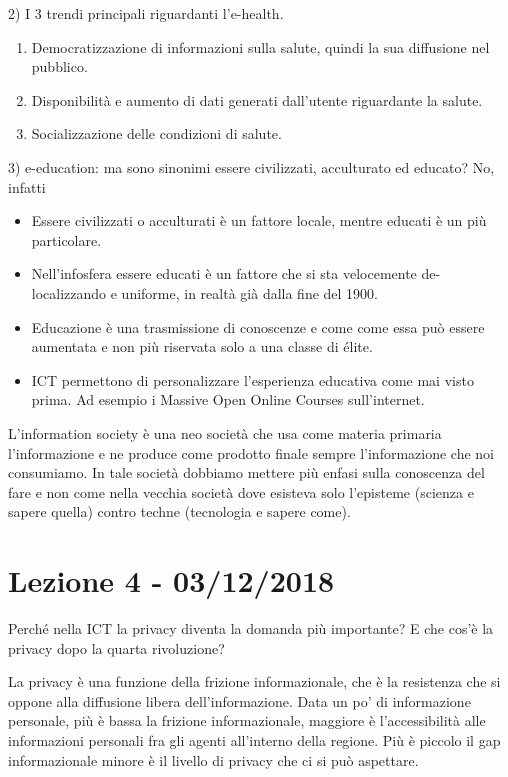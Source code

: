 \documentclass[a4page, 11pt]{article}
\begin{document}
2) I 3 trendi principali riguardanti l'e-health.

\begin{enumerate}
	\def\labelenumi{\arabic{enumi}.}
	 
	\item
	Democratizzazione di informazioni sulla salute, quindi la sua
	diffusione nel pubblico.
	\item
	Disponibilità e aumento di dati generati dall'utente riguardante la salute.
	\item
	Socializzazione delle condizioni di salute.
\end{enumerate}

3) e-education: ma sono sinonimi essere civilizzati, acculturato ed
educato? No, infatti

\begin{itemize}
	 
	\item
	Essere civilizzati o acculturati è un fattore locale, mentre educati è
	un più particolare.
	\item
	Nell'infosfera essere educati è un fattore che si sta velocemente
	de-localizzando e uniforme, in realtà già dalla fine del 1900.
	\item
	Educazione è una trasmissione di conoscenze e come come essa può
	essere aumentata e non più riservata solo a una classe di élite.
	\item
	ICT permettono di personalizzare l'esperienza educativa come mai visto
	prima. Ad esempio i Massive Open Online Courses sull'internet.
\end{itemize}

L'information society è una neo società che usa come materia primaria
l'informazione e ne produce come prodotto finale sempre l'informazione
che noi consumiamo. In tale società dobbiamo mettere più enfasi sulla
conoscenza del fare e non come nella vecchia società dove esisteva solo
l'episteme (scienza e sapere quella) contro techne (tecnologia e sapere
come).
\section*{Lezione 4 - 03/12/2018}

Perché nella ICT la privacy diventa la domanda più importante? E che
cos'è la privacy dopo la quarta rivoluzione?

La privacy è una funzione della frizione informazionale, che è la
resistenza che si oppone alla diffusione libera dell'informazione. Data
un po' di informazione personale, più è bassa la frizione
informazionale, maggiore è l'accessibilità alle informazioni personali
fra gli agenti all'interno della regione. Più è piccolo il gap
informazionale minore è il livello di privacy che ci si può aspettare.
\end{document}
